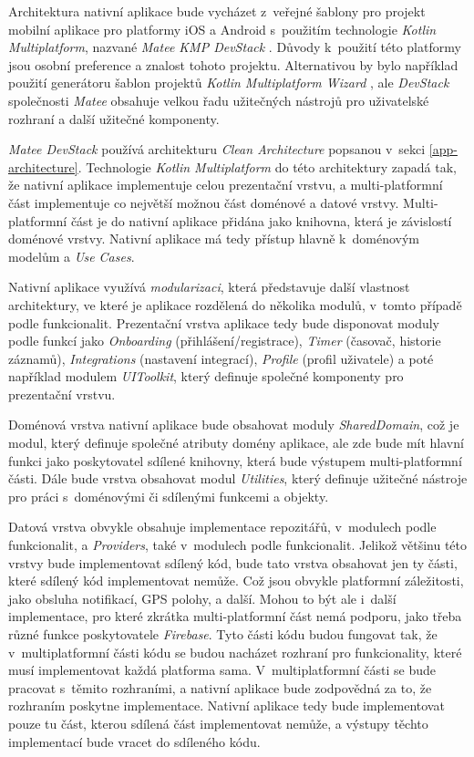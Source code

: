 Architektura nativní aplikace bude vycházet z~veřejné šablony pro projekt mobilní aplikace pro platformy iOS a Android s~použitím technologie \emph{Kotlin Multiplatform}, nazvané \emph{Matee KMP DevStack} \cite{matee-devstack}. Důvody k~použití této platformy jsou osobní preference a znalost tohoto projektu. Alternativou by bylo například použití generátoru šablon projektů \emph{Kotlin Multiplatform Wizard} \cite{kmp-wizard}, ale \emph{DevStack} společnosti \emph{Matee} obsahuje velkou řadu užitečných nástrojů pro uživatelské rozhraní a další užitečné komponenty.

\emph{Matee DevStack} používá architekturu \emph{Clean Architecture} popsanou v~sekci \ref{app-architecture}. Technologie \emph{Kotlin Multiplatform} do této architektury zapadá tak, že nativní aplikace implementuje celou prezentační vrstvu, a multi-platformní část implementuje co největší možnou část doménové a datové vrstvy. Multi-platformní část je do nativní aplikace přidána jako knihovna, která je závislostí doménové vrstvy. Nativní aplikace má tedy přístup hlavně k~doménovým modelům a \emph{Use Cases}.

Nativní aplikace využívá \emph{modularizaci}, která představuje další vlastnost architektury, ve které je aplikace rozdělená do několika modulů, v~tomto případě podle funkcionalit. Prezentační vrstva aplikace tedy bude disponovat moduly podle funkcí jako \emph{Onboarding} (přihlášení/registrace), \emph{Timer} (časovač, historie záznamů), \emph{Integrations} (nastavení integrací), \emph{Profile} (profil uživatele) a poté například modulem \emph{UIToolkit}, který definuje společné komponenty pro prezentační vrstvu.

Doménová vrstva nativní aplikace bude obsahovat moduly \emph{SharedDomain}, což je modul, který definuje společné atributy domény aplikace, ale zde bude mít hlavní funkci jako poskytovatel sdílené knihovny, která bude výstupem multi-platformní části. Dále bude vrstva obsahovat modul \emph{Utilities}, který definuje užitečné nástroje pro práci s~doménovými či sdílenými funkcemi a objekty.

Datová vrstva obvykle obsahuje implementace repozitářů, v~modulech podle funkcionalit, a \emph{Providers}, také v~modulech podle funkcionalit. Jelikož většinu této vrstvy bude implementovat sdílený kód, bude tato vrstva obsahovat jen ty části, které sdílený kód implementovat nemůže. Což jsou obvykle platformní záležitosti, jako obsluha notifikací, GPS polohy, a další. Mohou to být ale i~další implementace, pro které zkrátka multi-platformní část nemá podporu, jako třeba různé funkce poskytovatele \emph{Firebase}. Tyto části kódu budou fungovat tak, že v~multiplatformní části kódu se budou nacházet rozhraní pro funkcionality, které musí implementovat každá platforma sama. V~multiplatformní části se bude pracovat s~těmito rozhraními, a nativní aplikace bude zodpovědná za to, že rozhraním poskytne implementace. Nativní aplikace tedy bude implementovat pouze tu část, kterou sdílená část implementovat nemůže, a výstupy těchto implementací bude vracet do sdíleného kódu.

